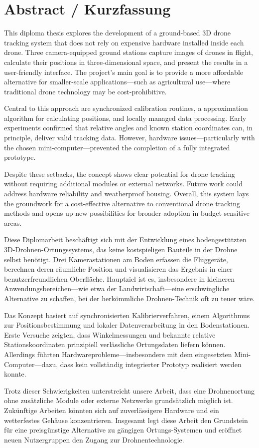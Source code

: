 \chapter*{Abstract / Kurzfassung}
\label{cha:abstract}

This diploma thesis explores the development of a ground-based 3D drone tracking system that does not rely on expensive hardware installed inside each drone. Three camera-equipped ground stations capture images of drones in flight, calculate their positions in three-dimensional space, and present the results in a user-friendly interface. The project’s main goal is to provide a more affordable alternative for smaller-scale applications—such as agricultural use—where traditional drone technology may be cost-prohibitive.

Central to this approach are synchronized calibration routines, a approximation algorithm for calculating positions, and locally managed data processing. Early experiments confirmed that relative angles and known station coordinates can, in principle, deliver valid tracking data. However, hardware issues—particularly with the chosen mini-computer—prevented the completion of a fully integrated prototype.

Despite these setbacks, the concept shows clear potential for drone tracking without requiring additional modules or external networks. Future work could address hardware reliability and weatherproof housing. Overall, this system lays the groundwork for a cost-effective alternative to conventional drone tracking methods and opens up new possibilities for broader adoption in budget-sensitive areas.

\vspace{1cm}

Diese Diplomarbeit beschäftigt sich mit der Entwicklung eines bodengestützten 3D-Drohnen-Ortungssystems, das keine kostspieligen Bauteile in der Drohne selbst benötigt. Drei Kamerastationen am Boden erfassen die Fluggeräte, berechnen deren räumliche Position und visualisieren das Ergebnis in einer benutzerfreundlichen Oberfläche. Hauptziel ist es, insbesondere in kleineren Anwendungsbereichen—wie etwa der Landwirtschaft—eine erschwingliche Alternative zu schaffen, bei der herkömmliche Drohnen-Technik oft zu teuer wäre.

Das Konzept basiert auf synchronisierten Kalibrierverfahren, einem Algorithmus zur Positionsbestimmung und lokaler Datenverarbeitung in den Bodenstationen. Erste Versuche zeigten, dass Winkelmessungen und bekannte relative Stationskoordinaten prinzipiell verlässliche Ortungsdaten liefern können. Allerdings führten Hardwareprobleme—insbesondere mit dem eingesetzten Mini-Computer—dazu, dass kein vollständig integrierter Prototyp realisiert werden konnte.

Trotz dieser Schwierigkeiten unterstreicht unsere Arbeit, dass eine Drohnenortung ohne zusätzliche Module oder externe Netzwerke grundsätzlich möglich ist. Zukünftige Arbeiten könnten sich auf zuverlässigere Hardware und ein wetterfestes Gehäuse konzentrieren. Insgesamt legt diese Arbeit den Grundstein für eine preisgünstige Alternative zu gängigen Ortungs-Systemen und eröffnet neuen Nutzergruppen den Zugang zur Drohnentechnologie.
